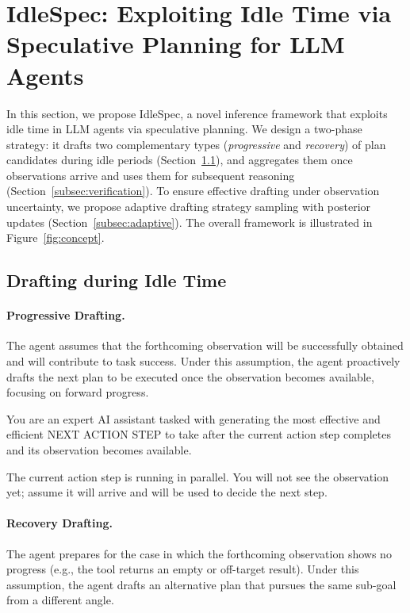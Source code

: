 \section{IdleSpec: Exploiting Idle Time via Speculative Planning for LLM Agents}
\label{sec:method}
In this section, we propose IdleSpec, a novel inference framework that exploits idle time in LLM agents via speculative planning. We design a two-phase strategy: it drafts two complementary types (\ie \textit{progressive} and \textit{recovery}) of plan candidates during idle periods (Section~\ref{subsec:drafting}), and aggregates them once observations arrive and uses them for subsequent reasoning (Section~\ref{subsec:verification}). To ensure effective drafting under observation uncertainty, we propose adaptive drafting strategy sampling with posterior updates (Section~\ref{subsec:adaptive}). The overall framework is illustrated in Figure~\ref{fig:concept}.
\subsection{Drafting during Idle Time}
\label{subsec:drafting}

\paragraph{Progressive Drafting.}
The agent assumes that the forthcoming observation will be successfully obtained and will contribute to task success. Under this assumption, the agent proactively drafts the next plan to be executed once the observation becomes available, 
focusing on forward progress.

\begin{tcolorbox}[title=Progressive Drafting Prompt, fontupper=\small, width=\linewidth]
You are an expert AI assistant tasked with generating the most effective and efficient NEXT ACTION STEP to take after the current action step completes and its observation becomes available.

The current action step is running in parallel.
You will not see the observation yet; assume it will arrive and will be used to decide the next step.
\end{tcolorbox}

\paragraph{Recovery Drafting.}
The agent prepares for the case in which the forthcoming observation shows no progress (e.g., the tool returns an empty or off-target result). Under this assumption, the agent drafts an alternative plan that pursues the same sub-goal from a different angle.

